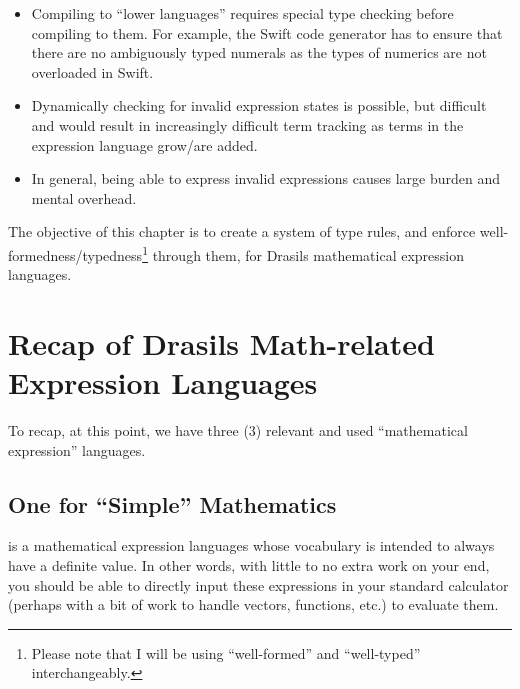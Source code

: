 \begin{itemize}

      \item Compiling to ``lower languages'' requires special type checking
            before compiling to them. For example, the Swift code generator has
            to ensure that there are no ambiguously typed numerals as the types
            of numerics are not overloaded in Swift.

      \item Dynamically checking for invalid expression states is possible, but
            difficult and would result in increasingly difficult term tracking
            as terms in the expression language grow/are added.

      \item In general, being able to express invalid expressions causes large
            burden and mental overhead.

\end{itemize}













The objective of this chapter is to create a system of type rules, and enforce
well-formedness/typedness\footnote{Please note that I will be using
``well-formed'' and ``well-typed'' interchangeably.} through them, for Drasils
mathematical expression languages.

\section{Recap of Drasils Math-related Expression Languages}

To recap, at this point, we have three (3) relevant and used ``mathematical
expression'' languages.

\subsection{One for \textquotedblleft{}Simple\textquotedblright{} Mathematics}

\Expr{} is a mathematical expression languages whose vocabulary is intended to
always have a definite value. In other words, with little to no extra work on
your end, you should be able to directly input these expressions in your
standard calculator (perhaps with a bit of work to handle vectors, functions,
etc.) to evaluate them.

